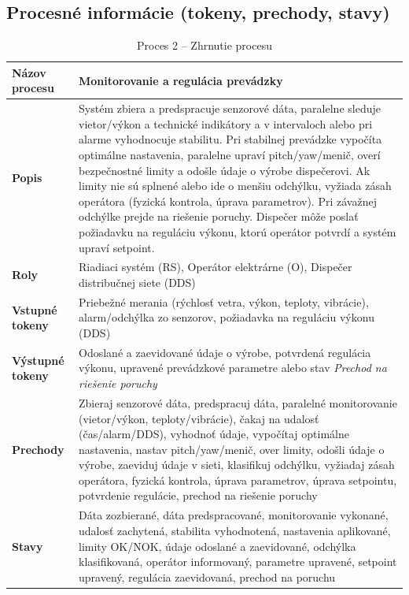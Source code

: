 \documentclass[12pt,a4paper]{article}
\begin{document}
\subsection{Procesné informácie (tokeny, prechody, stavy)}
\begin{table}[H]
  \centering
  \renewcommand{\arraystretch}{1.2}
  \begin{tabularx}{\textwidth}{|p{}|X|}
    \hline
    \textbf{Názov procesu} & Monitorovanie a regulácia prevádzky \\
    \hline
    \textbf{Popis} & Systém zbiera a predspracuje senzorové dáta, paralelne sleduje vietor/výkon a technické indikátory a v intervaloch alebo pri alarme vyhodnocuje stabilitu. Pri stabilnej prevádzke vypočíta optimálne nastavenia, paralelne upraví pitch/yaw/menič, overí bezpečnostné limity a odošle údaje o výrobe dispečerovi. Ak limity nie sú splnené alebo ide o menšiu odchýlku, vyžiada zásah operátora (fyzická kontrola, úprava parametrov). Pri závažnej odchýlke prejde na riešenie poruchy. Dispečer môže poslať požiadavku na reguláciu výkonu, ktorú operátor potvrdí a systém upraví setpoint. \\
    \hline
    \textbf{Roly} & Riadiaci systém (RS), Operátor elektrárne (O), Dispečer distribučnej siete (DDS) \\
    \hline
    \textbf{Vstupné tokeny} & Priebežné merania (rýchlosť vetra, výkon, teploty, vibrácie), alarm/odchýlka zo senzorov, požiadavka na reguláciu výkonu (DDS) \\
    \hline
    \textbf{Výstupné tokeny} & Odoslané a zaevidované údaje o výrobe, potvrdená regulácia výkonu, upravené prevádzkové parametre alebo stav \emph{Prechod na riešenie poruchy} \\
    \hline
    \textbf{Prechody} & Zbieraj senzorové dáta, predspracuj dáta, paralelné monitorovanie (vietor/výkon, teploty/vibrácie), čakaj na udalosť (čas/alarm/DDS), vyhodnoť údaje, vypočítaj optimálne nastavenia, nastav pitch/yaw/menič, over limity, odošli údaje o výrobe, zaeviduj údaje v sieti, klasifikuj odchýlku, vyžiadaj zásah operátora, fyzická kontrola, úprava parametrov, úprava setpointu, potvrdenie regulácie, prechod na riešenie poruchy \\
    \hline
    \textbf{Stavy} & Dáta zozbierané, dáta predspracované, monitorovanie vykonané, udalosť zachytená, stabilita vyhodnotená, nastavenia aplikované, limity OK/NOK, údaje odoslané a zaevidované, odchýlka klasifikovaná, operátor informovaný, parametre upravené, setpoint upravený, regulácia zaevidovaná, prechod na poruchu \\
    \hline
  \end{tabularx}
  \caption{Proces 2 -- Zhrnutie procesu}
\end{table}
\end{document}
